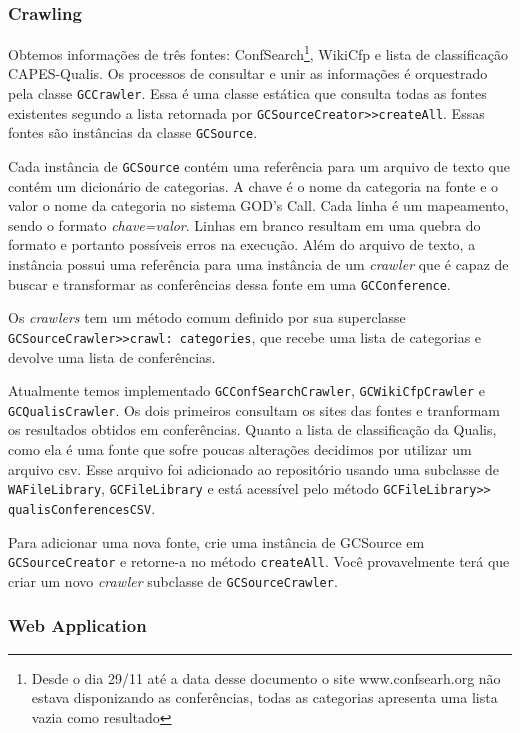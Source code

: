 \subsubsection{Crawling}%
Obtemos informações de três fontes: ConfSearch\footnote{Desde o dia 29/11 até a data desse documento o site www.confsearh.org não estava disponizando as conferências, todas as categorias
apresenta uma lista vazia como resultado}, WikiCfp e lista de classificação CAPES-Qualis. 
Os processos de consultar e unir as informações é orquestrado pela classe \texttt{GCCrawler}. 
Essa é uma classe estática que consulta todas as fontes existentes segundo a lista retornada por \texttt{GCSourceCreator>>createAll}. 
Essas fontes são instâncias da classe \texttt{GCSource}. 

Cada instância de \texttt{GCSource} contém uma referência para um arquivo de texto que contém um dicionário de categorias. 
A chave é o nome da categoria na fonte e o valor o nome da 
categoria no sistema GOD's Call. Cada linha é um mapeamento, sendo o formato \textit{chave=valor}. Linhas em branco resultam em uma quebra do formato e portanto possíveis 
erros na execução. Além do arquivo de texto, a instância possui uma referência para uma instância de um \textit{crawler} que é capaz de buscar e transformar as conferências dessa 
fonte em uma \texttt{GCConference}.

Os \textit{crawlers} tem um método comum definido por sua superclasse \texttt{GCSourceCrawler>>crawl: categories}, que recebe uma lista de categorias e devolve uma lista de conferências.

Atualmente temos implementado \texttt{GCConfSearchCrawler}, \texttt{GCWikiCfpCrawler} e \texttt{GCQualisCrawler}. 
Os dois primeiros consultam os sites das fontes e tranformam os resultados obtidos em conferências. 
Quanto a lista de classificação da Qualis, como ela é uma fonte que sofre poucas alterações decidimos por utilizar um arquivo csv. Esse arquivo foi adicionado ao repositório usando uma subclasse de \texttt{WAFileLibrary}, \texttt{GCFileLibrary} e está acessível pelo método \texttt{GCFileLibrary>> qualisConferencesCSV}. 

Para adicionar uma nova fonte, crie uma instância de GCSource em \texttt{GCSourceCreator} e retorne-a no método \texttt{createAll}. Você provavelmente terá que criar um novo \textit{crawler} subclasse de \texttt{GCSourceCrawler}.

\subsubsection{Web Application} %

